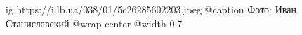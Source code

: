  
 
 
 
 

\ifcmt
  ig https://i.lb.ua/038/01/5c26285602203.jpeg
	@caption Фото: Иван Станиславский
  @wrap center
  @width 0.7
\fi
